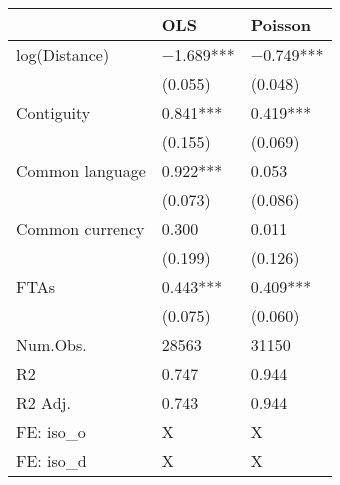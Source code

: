 \begin{tabular}{lll}
\hline
& OLS & Poisson \\ \hline
log(Distance) & \num{-1.689}*** & \num{-0.749}*** \\
& (\num{0.055}) & (\num{0.048}) \\
Contiguity & \num{0.841}*** & \num{0.419}*** \\
& (\num{0.155}) & (\num{0.069}) \\
Common language & \num{0.922}*** & \num{0.053} \\
& (\num{0.073}) & (\num{0.086}) \\
Common currency & \num{0.300} & \num{0.011} \\
& (\num{0.199}) & (\num{0.126}) \\
FTAs & \num{0.443}*** & \num{0.409}*** \\
& (\num{0.075}) & (\num{0.060}) \\
Num.Obs. & \num{28563} & \num{31150} \\
R2 & \num{0.747} & \num{0.944} \\
R2 Adj. & \num{0.743} & \num{0.944} \\
FE: iso\_o & X & X \\
FE: iso\_d & X & X \\
\hline
\end{tabular}
